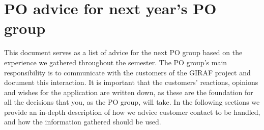 \chapter{PO advice for next year's PO group} \label{appendix:PO-advice}

This document serves as a list of advice for the next PO group based on the experience we gathered throughout the semester.
The PO group's main responsibility is to communicate with the customers of the GIRAF project and document this interaction.
It is important that the customers' reactions, opinions and wishes for the application are written down, as these are the foundation for all the decisions that you, as the PO group, will take.
In the following sections we provide an in-depth description of how we advice customer contact to be handled, and how the information gathered should be used.

